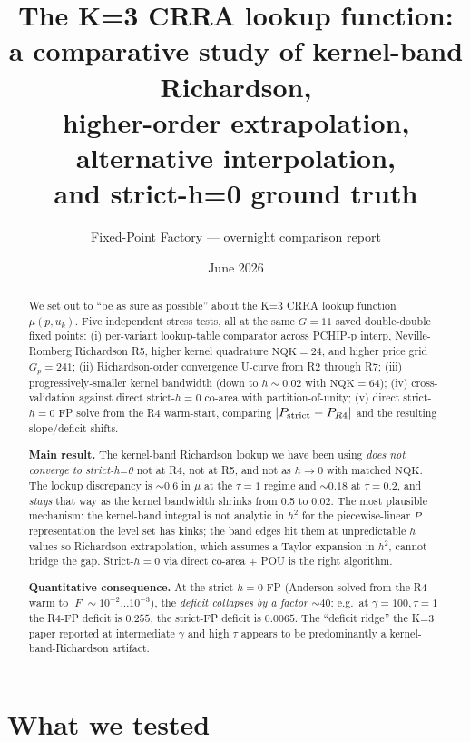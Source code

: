 \documentclass[11pt]{article}
\title{The K=3 CRRA lookup function:\\
       a comparative study of kernel-band Richardson,\\
       higher-order extrapolation, alternative interpolation,\\
       and strict-h=0 ground truth}
\author{Fixed-Point Factory --- overnight comparison report}
\date{June 2026}
\begin{document}
\maketitle

\begin{abstract}
\noindent
We set out to ``be as sure as possible'' about the K=3 CRRA lookup function
$\mu(p, u_k)$. Five independent stress tests, all at the same $G{=}11$
saved double-double fixed points: (i) per-variant lookup-table comparator
across PCHIP-p interp, Neville-Romberg Richardson R5, higher kernel
quadrature $\mathrm{NQK}{=}24$, and higher price grid $G_p{=}241$;
(ii) Richardson-order convergence U-curve from R2 through R7;
(iii) progressively-smaller kernel bandwidth (down to $h{\sim}0.02$ with
$\mathrm{NQK}{=}64$); (iv) cross-validation against direct
strict-$h{=}0$ co-area with partition-of-unity;
(v) direct strict-$h{=}0$ FP solve from the R4 warm-start, comparing
$|P_{\rm strict} - P_{R4}|$ and the resulting slope/deficit shifts.

\textbf{Main result.} The kernel-band Richardson lookup we have been using
\emph{does not converge to strict-h=0} \-\- not at R4, not at R5, and not as
$h \to 0$ with matched $\mathrm{NQK}$. The lookup discrepancy is
$\sim 0.6$ in $\mu$ at the $\tau{=}1$ regime and $\sim 0.18$ at $\tau{=}0.2$,
and \emph{stays} that way as the kernel bandwidth shrinks from 0.5 to 0.02.
The most plausible mechanism: the kernel-band integral is not analytic
in $h^2$ for the piecewise-linear $P$ representation \-\- the level set
has kinks; the band edges hit them at unpredictable $h$ values
\-\- so Richardson extrapolation, which assumes a Taylor expansion in $h^2$,
cannot bridge the gap. Strict-$h{=}0$ via direct co-area + POU is the
right algorithm.

\textbf{Quantitative consequence.} At the strict-$h{=}0$ FP (Anderson-solved
from the R4 warm to $|F| \sim 10^{-2}\!\dots\!10^{-3}$), the
\emph{deficit collapses by a factor $\sim 40$}: e.g.\ at $\gamma{=}100, \tau{=}1$
the R4-FP deficit is $0.255$, the strict-FP deficit is $0.0065$. The
``deficit ridge'' the K=3 paper reported at intermediate $\gamma$ and high
$\tau$ appears to be predominantly a kernel-band-Richardson artifact.
\end{abstract}

\section{What we tested}
\end{document}
